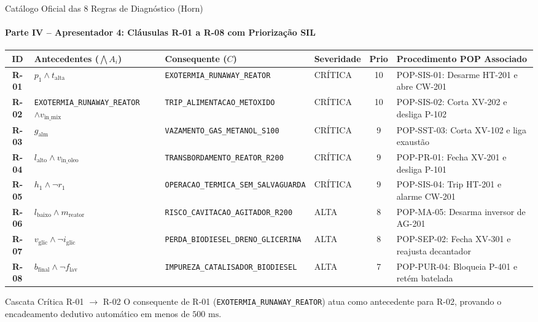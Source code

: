 \documentclass[aspectratio=169, 10pt]{beamer}
\begin{document}
\begin{frame}{Catálogo Oficial das 8 Regras de Diagnóstico (Horn)}
  \framesubtitle{Parte IV -- Apresentador 4: Cláusulas R-01 a R-08 com Priorização SIL}
  \begin{table}[h]
    \centering
    \tiny
    \begin{tabular}{clllcl}
      \toprule
      \textbf{ID} & \textbf{Antecedentes ($\bigwedge A_i$)} & \textbf{Consequente ($C$)} & \textbf{Severidade} & \textbf{Prio} & \textbf{Procedimento POP Associado} \\
      \midrule
      \textbf{R-01} & $p_1 \land t_{\text{alta}}$ & \texttt{EXOTERMIA\_RUNAWAY\_REATOR} & CRÍTICA & 10 & POP-SIS-01: Desarme HT-201 e abre CW-201 \\
      \textbf{R-02} & \texttt{EXOTERMIA\_RUNAWAY\_REATOR} $\land v_{\text{in\_mix}}$ & \texttt{TRIP\_ALIMENTACAO\_METOXIDO} & CRÍTICA & 10 & POP-SIS-02: Corta XV-202 e desliga P-102 \\
      \textbf{R-03} & $g_{\text{alm}}$ & \texttt{VAZAMENTO\_GAS\_METANOL\_S100} & CRÍTICA & 9 & POP-SST-03: Corta XV-102 e liga exaustão \\
      \textbf{R-04} & $l_{\text{alto}} \land v_{\text{in\_oleo}}$ & \texttt{TRANSBORDAMENTO\_REATOR\_R200} & CRÍTICA & 9 & POP-PR-01: Fecha XV-201 e desliga P-101 \\
      \textbf{R-05} & $h_1 \land \neg r_1$ & \texttt{OPERACAO\_TERMICA\_SEM\_SALVAGUARDA} & CRÍTICA & 9 & POP-SIS-04: Trip HT-201 e alarme CW-201 \\
      \textbf{R-06} & $l_{\text{baixo}} \land m_{\text{reator}}$ & \texttt{RISCO\_CAVITACAO\_AGITADOR\_R200} & ALTA & 8 & POP-MA-05: Desarma inversor de AG-201 \\
      \textbf{R-07} & $v_{\text{glic}} \land \neg i_{\text{glic}}$ & \texttt{PERDA\_BIODIESEL\_DRENO\_GLICERINA} & ALTA & 8 & POP-SEP-02: Fecha XV-301 e reajusta decantador \\
      \textbf{R-08} & $b_{\text{final}} \land \neg f_{\text{lav}}$ & \texttt{IMPUREZA\_CATALISADOR\_BIODIESEL} & ALTA & 7 & POP-PUR-04: Bloqueia P-401 e retém batelada \\
      \bottomrule
    \end{tabular}
  \end{table}
  \vspace{0.2cm}
  \begin{alertblock}{Cascata Crítica R-01 $\to$ R-02}
    O consequente de R-01 (\texttt{EXOTERMIA\_RUNAWAY\_REATOR}) atua como antecedente para R-02, provando o encadeamento dedutivo automático em menos de $500\text{ ms}$.
  \end{alertblock}
\end{frame}
\end{document}
